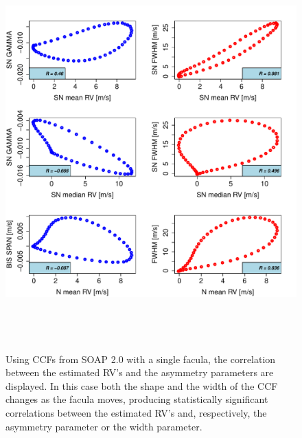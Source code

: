 \documentclass{aa}
\begin{document}
\begin{figure}[htbp]
\begin{center}
\includegraphics[height = 6in]{SOAP_FACULAE_Comparison_para_SN.pdf} 
   \caption{Using CCFs from SOAP 2.0 with a single facula, the correlation between the estimated RV's and the asymmetry parameters are displayed. In this case both the shape and the width of the CCF changes as the facula moves, producing statistically significant correlations between the estimated RV's and, respectively, the asymmetry parameter or the width parameter.}
    \label{fig:faculae.corr}
\end{center}
\end{figure}
\end{document}
